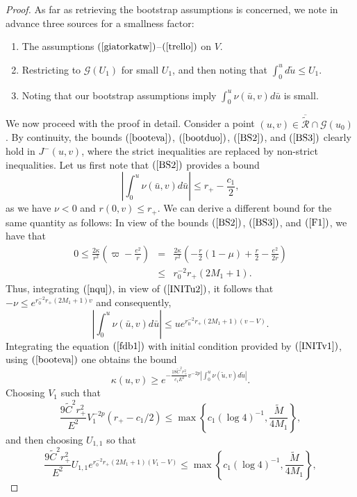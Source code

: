 \documentclass{article}
\begin{document}
{\begin{proof}
As far as retrieving the bootstrap assumptions is concerned, we
note in advance three sources for a smallness factor:
\begin{enumerate}
\item
The assumptions $(\ref{giatorkatw})$--$(\ref{trello})$ on $V$.
\item
Restricting to $\mathcal{G}(U_1)$ for small
$U_1$, and then noting that $\int_0^u d\tilde{u}\le U_1$.
\item
Noting that our bootstrap assumptions imply $\int_0^{u}\nu(\bar{u},v) d\bar{u}$
is small.
\end{enumerate}

We now proceed with the proof in detail. Consider a point
$(u,v)\in\overline{\tilde{\mathcal{R}}}\cap\mathcal{G}(u_0)$. By continuity,
the bounds
$(\ref{booteva})$, $(\ref{bootduo})$, 
$(\ref{BS2})$, and $(\ref{BS3})$ clearly hold in $J^-(u,v)$,
where the strict inequalities are replaced by non-strict inequalities.
Let us first note that $(\ref{BS2})$ provides a bound
\begin{equation}
\label{nfirst}
\left|\int_0^u{\nu(\bar{u},v) d\bar{u}}\right|\le r_+-\frac{c_1}2,
\end{equation}
as we have $\nu<0$ and $r(0,v)\le r_+$.
We can derive a different bound for the same quantity
as follows: In view of the bounds $(\ref{BS2})$, $(\ref{BS3})$,
and $(\ref{F1})$, we have that
\begin{eqnarray*}
0\le\frac{2\kappa}{r^2}
\left(\varpi-\frac{e^2}{r}\right)&=&
\frac{2\kappa}{r^2}\left(-\frac r2(1-\mu)+\frac r2-\frac{e^2}{2r}\right)\\
&\le& r_0^{-2}r_+(2M_1+1).
\end{eqnarray*}
Thus, integrating
$(\ref{nqu})$, in view of $(\ref{INITu2})$,
it follows that $-\nu\le e^{r_0^{-2}r_+(2M_1+1)v}$ and consequently,
\begin{equation}
\label{nsecond}
\left|\int_0^u{\nu(\bar{u},v)d\bar{u}}\right|\le ue^{r_0^{-2}r_+(2M_1+1)(v-V)}.
\end{equation}
Integrating the equation $(\ref{fdb1})$ with initial condition
provided by $(\ref{INITv1})$, using
$(\ref{booteva})$ one obtains the bound 
\[
\kappa(u,v)\ge 
e^{-\frac{18\tilde{C}^2r_+^2}{c_1E^2}v^{-2p}
\left|\int_0^u\nu(\tilde{u},v)d\tilde{u}\right|}.
\]
Choosing $V_1$ such that
\[ 
\frac{9\tilde{C}^2r_+^2}{E^2}V_1^{-2p}(r_+-c_1/2)
\le\max\left\{c_1(\log 4)^{-1},\frac{\tilde{M}}{4M_1}\right\},
\]
and then choosing $U_{1,1}$ so that
\[
\frac{9\tilde{C}^2r_+^2}{E^2}
U_{1,1}e^{r_0^{-2}r_+(2M_1+1)(V_1-V)}
\le\max\left\{c_1(\log 4)^{-1},\frac{\tilde{M}}{4M_1}\right\},
\]
\end{proof}}
\end{document}

